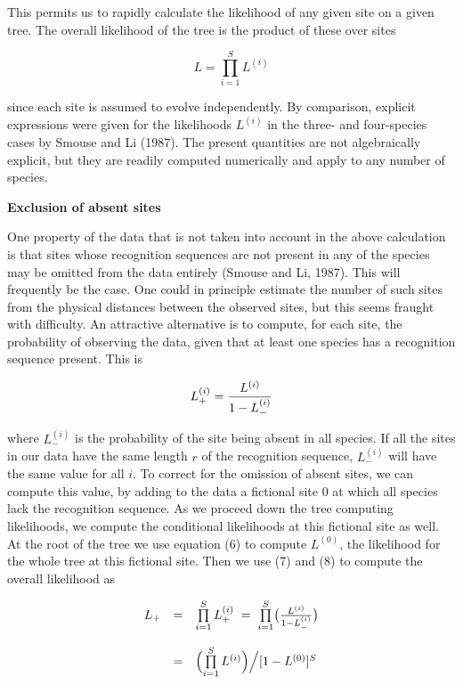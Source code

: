 This permits us to rapidly calculate the likelihood of any given site on a
given tree.  The overall likelihood of the tree is the product of these over
sites

\begin{equation} %
L   =   \prod\limits_{i=1}^S L^{(i)}
\end{equation}

since each site is assumed to evolve independently.   By comparison,
explicit expressions were given for the likelihoods $L^{(i)}$ in the three- and
four-species cases by Smouse and Li (1987).  The present quantities
are not algebraically explicit, but they are readily computed numerically
and apply to any number of species.
\bigskip

\centerline{\bf Exclusion of absent sites}

One property of the data that is not taken into account in the above
calculation is that sites whose recognition sequences are not present in any of 
the species may be omitted from the data entirely (Smouse and Li, 1987).  This
will frequently be the case.  One
could in principle estimate the number of such sites from the physical
distances between the observed sites, but this seems fraught with
difficulty.  An attractive alternative is to compute, for each site, the
probability of observing the data,
given that at least one species has a recognition sequence present.
This is

\begin{equation} %
L_+^{(i)}  =  {L^{(i)} \over {1 - L_-^{(i)}}}
\end{equation}

where $L_-^{(i)}$ is the probability of the site being absent in all species.
If all the sites in our data have the same length $r$
of the recognition sequence, $L_-^{(i)}$ will have the same value for all
$i$.  To correct for the omission of absent sites, we can compute this value,
by adding to the data a fictional site 0 at which all species lack the
recognition sequence.  As we proceed down the tree computing likelihoods, we
compute the
conditional likelihoods at this fictional site as well.  At the root of the
tree we use equation (6) to compute $L^{(0)}$, the likelihood for the whole tree at
this fictional site.  Then we use (7) and (8) to compute the overall
likelihood as

\begin{equation} %
\begin{array}{c c l}
L_+ &  =  & \prod\limits_{i=1}^S {L_+^{(i)}} \; =  \; \prod\limits_{i=1}^S \bigl( {{L^{(i)}} \over {1 - L_-^{(i)}}} \bigr) \\
    &     &  \\
    &  =  & \Bigl( \prod\limits_{i=1}^S L^{(i)} \Bigr) \Bigl/ {[1 - L^{(0)}]^S}
\end{array}
\end{equation}

